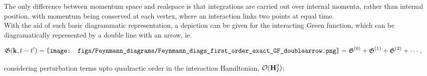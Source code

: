 \documentclass{homework}
\begin{document}
The only difference between momentum space and realspace is that integrations are carried out over internal momenta, rather than internal position, with momentum being conserved at each vertex, where an interaction links two points at equal time. \\

With the aid of such basic diagrammatic representation, a depiction can be given for the interacting Green function, which can be diagramatically represented by a double line with an arrow, ie. 

\begin{equation}
    \mathfrak{G}({\bf k}, t-t') = \texttt{[image: figs/Feynmann\_diagrams/Feynmann\_diags\_first\_order\_exact\_GF\_doublearrow.png]} = \mathfrak{G}^{(0)} + \mathfrak{G}^{(1)} + \mathfrak{G}^{(2)} + \cdots,
\end{equation}

considering perturbation terms upto quadractic order in the interaction Hamiltonian, $\mathcal{O}({\bf H}_I^2)$:
\end{document}
